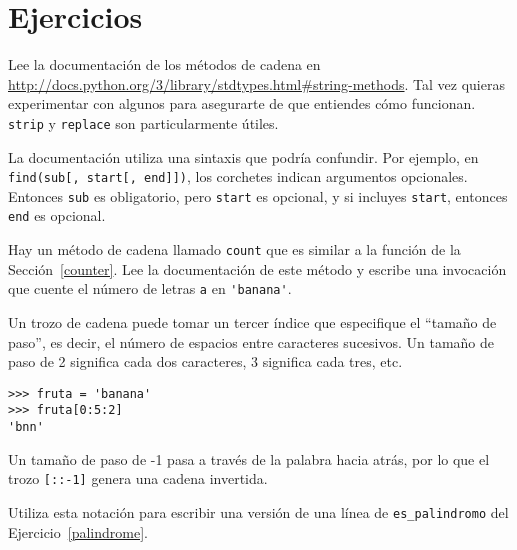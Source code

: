 \documentclass[10pt]{book}
\begin{document}
\section{Ejercicios}

\begin{exercise}

Lee la documentación de los métodos de cadena en
\url{http://docs.python.org/3/library/stdtypes.html#string-methods}.
Tal vez quieras experimentar con algunos para asegurarte de que
entiendes cómo funcionan.  {\tt strip} y {\tt replace} son
particularmente útiles.

La documentación utiliza una sintaxis que podría confundir.
Por ejemplo, en \verb"find(sub[, start[, end]])", los corchetes
indican argumentos opcionales.  Entonces {\tt sub} es obligatorio, pero
{\tt start} es opcional, y si incluyes {\tt start},
entonces {\tt end} es opcional.

\end{exercise}


\begin{exercise}

Hay un método de cadena llamado {\tt count} que es similar
a la función de la Sección~\ref{counter}.  Lee la documentación
de este método
y escribe una invocación que cuente el número de letras {\tt a}
en \verb"'banana'".
\end{exercise}


\begin{exercise}

Un trozo de cadena puede tomar un tercer índice que especifique el ``tamaño
de paso'', es decir, el número de espacios entre caracteres sucesivos.
Un tamaño de paso de 2 significa cada dos caracteres, 3 significa cada tres,
etc.

\begin{verbatim}
>>> fruta = 'banana'
>>> fruta[0:5:2]
'bnn'
\end{verbatim}

Un tamaño de paso de -1 pasa a través de la palabra hacia atrás, por lo que
el trozo \verb"[::-1]" genera una cadena invertida.

Utiliza esta notación para escribir una versión de una línea de \verb"es_palindromo"
del Ejercicio~\ref{palindrome}.
\end{exercise}
\end{document}
